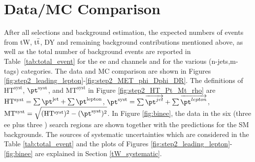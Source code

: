 
\clearpage
\section{Data/MC Comparison}
\label{tW_data_mc}
After all selections and background estimation, the expected numbers of events from tW, t$\bar{\rm t}$, DY and remaining background contributions mentioned above, as well as the total number of background events are reported in Table~\ref{tab:total_event} for the ee and \mumu channels and for the various (n-jets,m-tags) categories. The data and MC comparison are shown in Figures \ref{fig:step2_leading_lepton}-\ref{fig:step2_MET_phi_Dphi_DR}. The definitions of $\mathrm{HT^{syst}}$, $\mathrm{\pt^{syst}}$, and $\mathrm{MT^{syst}}$ in Figure \ref{fig:step2_HT_Pt_Mt_rho} are $\mathrm{HT^{syst}=\sum{\pt^{jet}}+\sum{\pt^{lepton}}}$, $\mathrm{\pt^{syst}=\sum{\overrightarrow{\pt^{jet}}}+\sum{\overrightarrow{\pt^{lepton}}}}$, $\mathrm{MT^{syst}=\sqrt{(HT^{syst})^{2}-(\pt^{syst})^{2}}}$.
In Figure \ref{fig:binee}, the data in the six (three ee plus three \mumu) search regions are shown together with the predictions for the SM backgrounds. The sources of systematic uncertainties which are considered in the Table \ref{tab:total_event} and the plots of Figures \ref{fig:step2_leading_lepton}-\ref{fig:binee} are explained in Section \ref{tW_systematic}.

